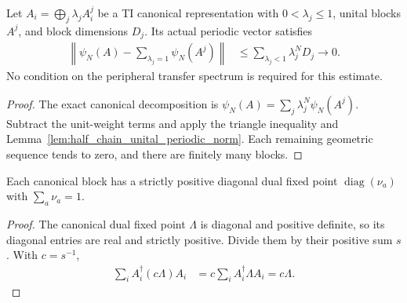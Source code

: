 \begin{lemma}
    \label{lem:half_chain_weighted_remainder}
    \leanok
    Let $A_i=\bigoplus_j \lambda_j A_i^j$ be a TI canonical representation with
    $0<\lambda_j\leq1$, unital blocks $A^j$, and block dimensions $D_j$.
    Its actual periodic vector satisfies
    \begin{align}
        \left\|\psi_N(A)-\sum_{\lambda_j=1}\psi_N(A^j)\right\|
         & \leq\sum_{\lambda_j<1}\lambda_j^N D_j\longrightarrow0.
        \label{eq:half_chain_weighted_remainder}
    \end{align}
    No condition on the peripheral transfer spectrum is required for
    this estimate.
\end{lemma}
\begin{proof}\leanok
    The exact canonical decomposition is
    $\psi_N(A)=\sum_j\lambda_j^N\psi_N(A^j)$.
    Subtract the unit-weight terms and apply the triangle inequality
    and Lemma~\ref{lem:half_chain_unital_periodic_norm}. Each remaining
    geometric sequence tends to zero, and there are finitely many blocks.
\end{proof}

\begin{lemma}
    \label{lem:half_chain_canonical_normalized_dual}
    \leanok
    Each canonical block has a strictly positive diagonal dual fixed point
    $\operatorname{diag}(\nu_a)$ with $\sum_a\nu_a=1$.
\end{lemma}
\begin{proof}\leanok
    The canonical dual fixed point $\Lambda$ is diagonal and positive
    definite, so its diagonal entries are real and strictly positive.
    Divide them by their positive sum $s$. With $c=s^{-1}$,
    \begin{align}
        \sum_iA_i^\dagger(c\Lambda)A_i
         & =c\sum_iA_i^\dagger\Lambda A_i=c\Lambda.
        \label{eq:half_chain_canonical_normalized_dual}
    \end{align}
\end{proof}

